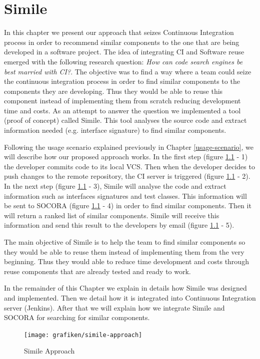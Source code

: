 \chapter{Simile}
\label{chap:simile}
In this chapter we present our approach that seizes Continuous Integration process in order to recommend similar components to the one that are being developed in a software project. The idea of integrating CI and Software reuse emerged with the following research question: \emph{How can code search engines be best married with CI?}. The objective was to find a way where a team could seize the continuous integration process in order to find similar components to the components they are developing. Thus they would be able to reuse this component instead of implementing them from scratch reducing development time and costs. As an attempt to answer the question we implemented a tool (proof of concept) called Simile. This tool analyses the source code and extract information needed (e.g. interface signature) to find similar components.

Following the usage scenario explained previously in Chapter \ref{usage-scenario}, we will describe how our proposed approach works. In the first step (figure \ref{fig:simile-01} - 1) the developer commits code to its local VCS. Then when the developer decides to push changes to the remote repository, the CI server is triggered (figure \ref{fig:simile-01} - 2). In the next step (figure \ref{fig:simile-01} - 3), Simile will analyse the code and extract information such as interfaces signatures and test classes. This information will be sent to SOCORA (figure \ref{fig:simile-01} - 4) in order to find similar components. Then it will return a ranked list of similar components. Simile will receive this information and send this result to the developers by email (figure \ref{fig:simile-01} - 5).

The main objective of Simile is to help the team to find similar components so they would be able to reuse them instead of implementing them from the very beginning. Thus they would able to reduce time development and costs through reuse components that are already tested and ready to work.

In the remainder of this Chapter we explain in details how Simile was designed and implemented. Then we detail how it is integrated into Continuous Integration server (Jenkins). After that we will explain how we integrate Simile and SOCORA for searching for similar components.

\begin{figure}[H]
	\centering
    \texttt{[image: grafiken/simile-approach]}
    \caption{Simile Approach}
    \label{fig:simile-01}
\end{figure}

